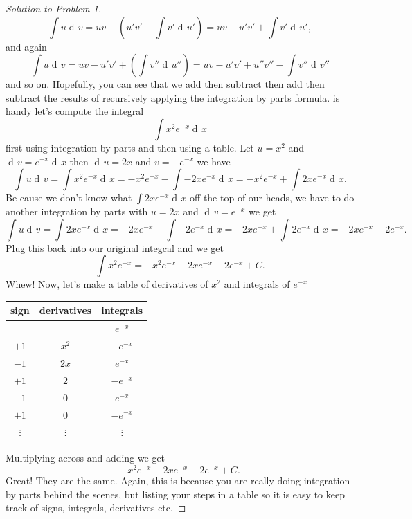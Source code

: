 \documentclass[12pt]{article}
\theoremstyle{plain}
\theoremstyle{definition}
\theoremstyle{remark}
\DeclareMathOperator{\diff}{d\!}
\begin{document}
\begin{proof}[Solution to Problem 1]
{\[
\int u\diff v=uv-\left(u' v'-\int v'\diff u'\right)=uv-u'v'+\int v'\diff u',
\]
and again
\[
\int u\diff v=uv-u'v'+\left(\int v''\diff u''\right)=uv-u'v'+u''v''-\int v''\diff v''
\]
and so on. Hopefully, you can see that we add then subtract then add then
subtract the results of recursively applying the integration by parts formula.
} is handy let's compute the integral
\[
\int x^2e^{-x}\diff x
\]
first using integration by parts and then using a table. Let $u=x^2$ and
$\diff v=e^{-x}\diff x$ then $\diff u=2x$ and $v=-e^{-x}$
we have
\[
\int u\diff v=\int x^2e^{-x}\diff x=-x^2e^{-x}-\int -2xe^{-x}\diff x
=-x^2e^{-x}+\int 2xe^{-x}\diff x.
\]
Be cause we don't know what $\int 2xe^{-x}\diff x$  off the top of our
heads, we have to do another integration by parts with $u=2x$ and $\diff
v=e^{-x}$ we get
\[
\int u\diff v=\int 2xe^{-x}\diff x=-2xe^{-x}-\int -2e^{-x}\diff
x=-2xe^{-x}+\int 2e^{-x}\diff x=-2xe^{-x}-2e^{-x}.
\]
Plug this back into our original integcal and we get
\[
\int x^2e^{-x}=-x^2e^{-x}-2xe^{-x}-2e^{-x}+C.
\]
Whew! Now, let's make a table of derivatives of $x^2$ and integrals of
$e^{-x}$
\begin{center}
\begin{tabular}{|c|c|c|}
\hline
sign&derivatives&integrals\\
\hline
~&~&$e^{-x}$\\
$+1$&$x^2$&$-e^{-x}$\\
$-1$&$2x$&$e^{-x}$\\
$+1$&$2$&$-e^{-x}$\\
$-1$&$0$&$e^{-x}$\\
$+1$&$0$&$-e^{-x}$\\
$\vdots$&$\vdots$&$\vdots$\\
\hline
\end{tabular}
\end{center}
Multiplying across and adding we get
\[
-x^2e^{-x}-2xe^{-x}-2e^{-x}+C.
\]
Great! They are the same. Again, this is because you are really doing
integration by parts behind the scenes, but listing your steps in a table
so it is easy to keep track of signs, integrals, derivatives etc.
\end{proof}
\end{document}
